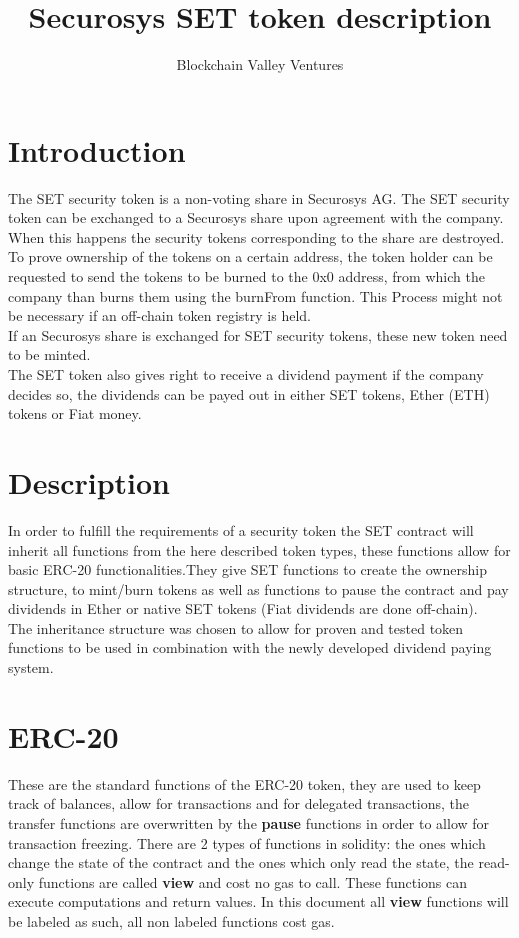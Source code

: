 \documentclass[12pt,a4paper]{article}
\author{Blockchain Valley Ventures}
\title{Securosys SET token description}
\begin{document}
\maketitle

\section*{Introduction}
The SET security token is a non-voting share in Securosys AG. The SET security token can be exchanged to a Securosys share upon agreement with the company. When this happens the security tokens corresponding to the share are destroyed. To prove ownership of the tokens on a certain address, the token holder can be requested to send the tokens to be burned to the 0x0 address, from which the company than burns them using the burnFrom function. This Process might not be necessary if an off-chain token registry is held.\\
If an Securosys share is exchanged for SET security tokens, these new token need to be minted.\\
The SET token also gives right to receive a dividend payment if the company decides so, the dividends can be payed out in either SET tokens, Ether (ETH) tokens or Fiat money.
\section*{Description}
In order to fulfill the requirements of a security token the SET contract will inherit all functions from the here described token types, these functions allow for basic ERC-20 functionalities.They give SET functions to create the ownership structure, to mint/burn tokens as well as functions to pause the contract and pay dividends in Ether or native SET tokens (Fiat dividends are done off-chain). \\
The inheritance structure was chosen to allow for proven and tested token functions to be used in combination with the newly developed dividend paying system.
\section*{ERC-20}
These are the standard functions of the ERC-20 token, they are used to keep track of balances, allow for transactions and for delegated transactions, the transfer functions are overwritten by the \textbf{pause} functions in order to allow for transaction freezing.
There are 2 types of functions in solidity: the ones which change the state of the contract and the ones which only read the state, the read-only functions are called \textbf{view} and cost no gas to call. These functions can execute computations and return values. In this document all \textbf{view} functions will be labeled as such, all non labeled functions cost gas.
\end{document}
